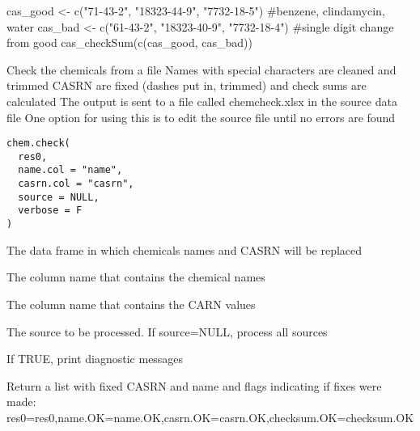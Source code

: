 \documentclass[letterpaper]{book}
\begin{document}
%
\begin{Examples}
\begin{ExampleCode}
cas_good <- c("71-43-2", "18323-44-9", "7732-18-5") #benzene, clindamycin, water
cas_bad  <- c("61-43-2", "18323-40-9", "7732-18-4") #single digit change from good
cas_checkSum(c(cas_good, cas_bad))
\end{ExampleCode}
\end{Examples}
%
\begin{Description}\relax
Check the chemicals from a file
Names with special characters are cleaned and trimmed
CASRN are fixed (dashes put in, trimmed) and check sums are calculated
The output is sent to a file called chemcheck.xlsx in the source data file
One option for using this is to edit the source file until no errors are found
\end{Description}
%
\begin{Usage}
\begin{verbatim}
chem.check(
  res0,
  name.col = "name",
  casrn.col = "casrn",
  source = NULL,
  verbose = F
)
\end{verbatim}
\end{Usage}
%
\begin{Arguments}
\begin{ldescription}
\item[\code{res0}] The data frame in which chemicals names and CASRN will be replaced

\item[\code{name.col}] The column name that contains the chemical names

\item[\code{casrn.col}] The column name that contains the CARN values

\item[\code{source}] The source to be processed. If source=NULL, process all sources

\item[\code{verbose}] If TRUE, print diagnostic messages
\end{ldescription}
\end{Arguments}
%
\begin{Value}
Return a list with fixed CASRN and name and flags indicating if fixes were made:
res0=res0,name.OK=name.OK,casrn.OK=casrn.OK,checksum.OK=checksum.OK
\end{Value}
\end{document}
